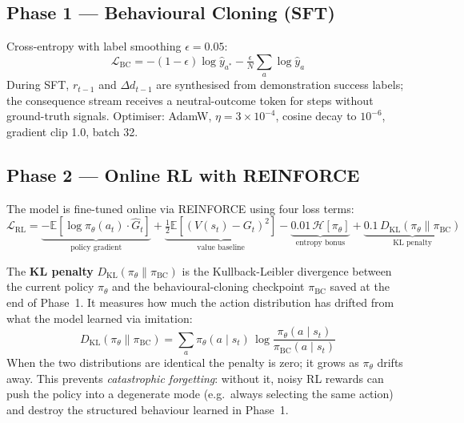 \documentclass{article}
\begin{document}
\subsection{Phase 1 — Behavioural Cloning (SFT)}

Cross-entropy with label smoothing $\epsilon{=}0.05$:
\begin{equation}
  \mathcal{L}_{\mathrm{BC}}
  = -(1{-}\epsilon)\log\hat{y}_{a^*}
    - \tfrac{\epsilon}{N}\textstyle\sum_{a}\log\hat{y}_a
  \label{eq:bc}
\end{equation}
During SFT, $r_{t-1}$ and $\Delta d_{t-1}$ are synthesised from
demonstration success labels; the consequence stream receives a
neutral-outcome token for steps without ground-truth signals.
Optimiser: AdamW, $\eta{=}3{\times}10^{-4}$, cosine decay to $10^{-6}$,
gradient clip 1.0, batch 32.

\subsection{Phase 2 — Online RL with REINFORCE~\citep{williams1992reinforce}}

The model is fine-tuned online via REINFORCE using four loss terms:
\begin{equation}
  \mathcal{L}_{\mathrm{RL}}
  = \underbrace{-\mathbb{E}[\log\pi_\theta(a_t)\cdot\hat{G}_t]}_{\text{policy gradient}}
  + \underbrace{\tfrac{1}{2}\mathbb{E}[(V(s_t){-}G_t)^2]}_{\text{value baseline}}
  - \underbrace{0.01\,\mathcal{H}[\pi_\theta]}_{\text{entropy bonus}}
  + \underbrace{0.1\,D_{\mathrm{KL}}(\pi_\theta\|\pi_{\mathrm{BC}})}_{\text{KL penalty}}
  \label{eq:rl}
\end{equation}

\noindent The \textbf{KL penalty} $D_{\mathrm{KL}}(\pi_\theta\|\pi_{\mathrm{BC}})$ is the
Kullback-Leibler divergence between the current policy $\pi_\theta$ and the
behavioural-cloning checkpoint $\pi_{\mathrm{BC}}$ saved at the end of Phase~1.
It measures how much the action distribution has drifted from what the model
learned via imitation:
\begin{equation}
  D_{\mathrm{KL}}(\pi_\theta \| \pi_{\mathrm{BC}})
  = \sum_{a} \pi_\theta(a \mid s_t)\,
    \log \frac{\pi_\theta(a \mid s_t)}{\pi_{\mathrm{BC}}(a \mid s_t)}
  \label{eq:kl}
\end{equation}
When the two distributions are identical the penalty is zero; it grows as
$\pi_\theta$ drifts away.
This prevents \emph{catastrophic forgetting}: without it, noisy RL rewards can
push the policy into a degenerate mode (e.g.\ always selecting the same action)
and destroy the structured behaviour learned in Phase~1.
\end{document}
